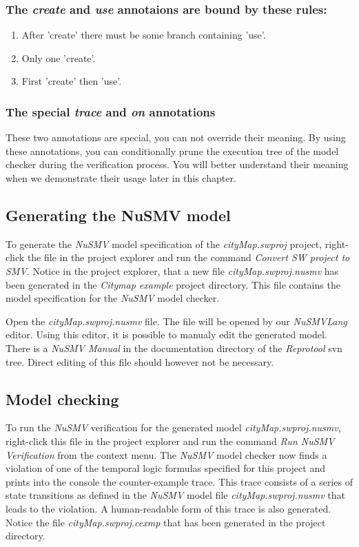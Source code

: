 \subsubsection{The \emph{create} and \emph{use} annotaions are bound by these rules:}

\begin{enumerate}
  \item After 'create' there must be some branch containing 'use'.
  \item Only one 'create'.
  \item First 'create' then 'use'.
\end{enumerate}

\subsubsection{The special \emph{trace} and \emph{on} annotations}
These two annotations are special, you can not override their meaning. By using these annotations, you can conditionally prune the
execution tree of the model checker during the verification process. You will better understand their meaning when we demonstrate
their usage later in this chapter.

\subsection{Generating the NuSMV model}
To generate the \emph{NuSMV} model specification of the \emph{cityMap.swproj} project, right-click the file in the project explorer
and run the command \emph{Convert SW project to SMV}. Notice in the project explorer, that a new file \emph{cityMap.swproj.nusmv} has
been generated in the \emph{Citymap example} project directory. This file contains the model specification for the \emph{NuSMV} model checker.

Open the \emph{cityMap.swproj.nusmv} file. The file will be opened by our \mbox{\emph{NuSMVLang}} editor. Using this editor, it is possible to manualy edit the generated model.
There is a \emph{NuSMV Manual} in the documentation directory of the \emph{Reprotool} svn tree. Direct editing of this
file should however not be necessary.


\subsection{Model checking}
To run the \emph{NuSMV} verification for the generated model \emph{cityMap.swproj.nusmv}, right-click this file in the project explorer
and run the command \emph{Run NuSMV Verification} from the context menu. The \emph{NuSMV} model checker now finds a violation of one of
the temporal logic formulas specified for this project and prints into the console the counter-example trace. This trace consists of
a series of state transitions as defined in the \emph{NuSMV} model file \emph{cityMap.swproj.nusmv} that leads to the violation.
A human-readable form of this trace is also generated. Notice the file \emph{cityMap.swproj.cexmp} that has been generated in the project
directory.

